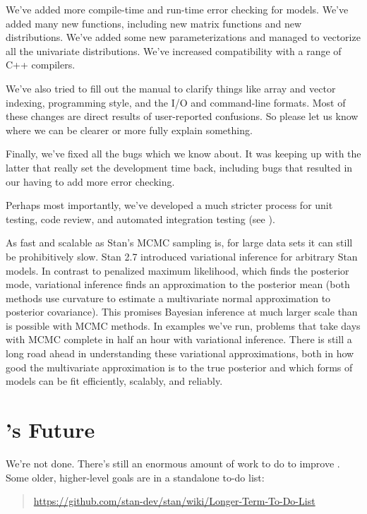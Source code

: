 We've added more compile-time and run-time error checking for models.
We've added many new functions, including new matrix functions and new
distributions.  We've added some new parameterizations and managed to
vectorize all the univariate distributions.  We've increased
compatibility with a range of C++ compilers.

We've also tried to fill out the manual to clarify things like array
and vector indexing, programming style, and the I/O and command-line
formats.  Most of these changes are direct results of user-reported
confusions.  So please let us know where we can be clearer or more
fully explain something.

Finally, we've fixed all the bugs which we know about.  It was keeping
up with the latter that really set the development time back,
including bugs that resulted in our having to add more error checking.

Perhaps most importantly, we've developed a much stricter process for
unit testing, code review, and automated integration testing (see
).

As fast and scalable as Stan's MCMC sampling is, for large data sets
it can still be prohibitively slow.  Stan 2.7 introduced variational
inference for arbitrary Stan models.  In contrast to penalized maximum
likelihood, which finds the posterior mode, variational inference
finds an approximation to the posterior mean (both methods use
curvature to estimate a multivariate normal approximation to posterior
covariance).  This promises Bayesian inference at much larger scale than is
possible with MCMC methods.  In examples we've run, problems that take
days with MCMC complete in half an hour with variational inference.
There is still a long road ahead in understanding these variational
approximations, both in how good the multivariate approximation is to
the true posterior and which forms of models can be fit efficiently,
scalably, and reliably.


\section*{\Stan's Future}

We're not done. There's still an enormous amount of work to do to
improve \Stan.  Some older, higher-level goals are in a standalone
to-do list:
%
\begin{quote}
\url{https://github.com/stan-dev/stan/wiki/Longer-Term-To-Do-List}
\end{quote}

